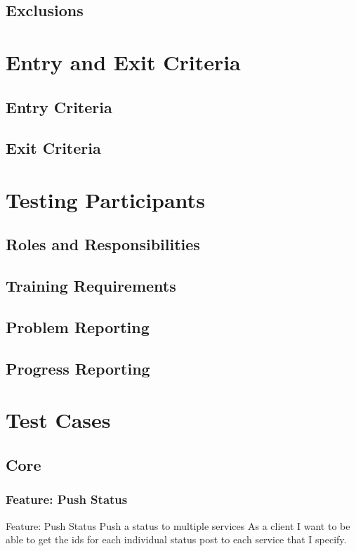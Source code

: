 \documentclass[12pt]{article}
\begin{document}
\subsection{Exclusions}

\section{Entry and Exit Criteria}
\subsection{Entry Criteria}
\subsection{Exit Criteria}

\section{Testing Participants}
\subsection{Roles and Responsibilities}
\subsection{Training Requirements}
\subsection{Problem Reporting}
\subsection{Progress Reporting}

\section{Test Cases}

\subsection{Core}

\subsubsection{Feature: Push Status}

Feature: Push Status
	Push a status to multiple services
	As a client
	I want to be able to get the ids for each individual status post to each 
	service that I specify.
	
\end{document}
